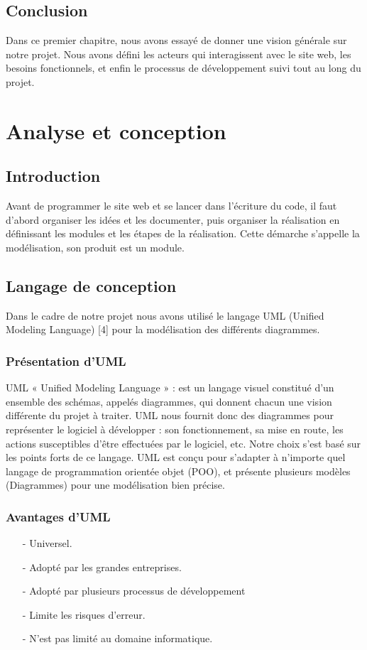 \documentclass[11.5pt]{report}
\begin{document}
\section{Conclusion}
Dans ce premier chapitre, nous avons essayé de donner une vision générale sur notre projet. Nous avons défini les acteurs qui interagissent avec le site web, les besoins fonctionnels, et enfin le processus de développement suivi tout au long du projet. 

\chapter{Analyse et conception}
\newpage
\section{Introduction}

Avant de programmer le site web et se lancer dans l’écriture du code, il faut d’abord organiser les idées et les documenter, puis organiser la réalisation en définissant les modules et les étapes de la réalisation. Cette démarche s’appelle la modélisation, son produit est un module.

\section{Langage de conception }
Dans le cadre de notre projet nous avons utilisé le langage UML (Unified Modeling Language) [4] pour la modélisation des différents diagrammes.
\subsection{Présentation d’UML }
UML « Unified Modeling Language » : est un langage visuel constitué d’un ensemble des schémas, appelés diagrammes, qui donnent chacun une vision différente du projet à traiter.
UML nous fournit donc des diagrammes pour représenter le logiciel à développer : son fonctionnement, sa mise en route, les actions susceptibles d’être effectuées par le logiciel, etc.
Notre choix s'est basé sur les points forts de ce langage. UML est conçu pour s'adapter à n'importe quel langage de programmation orientée objet (POO), et présente plusieurs modèles (Diagrammes) pour une modélisation bien précise.\\

\subsection{Avantages d’UML }
\begin{itemize}
	\item [-] Universel.
	\item [-] Adopté par les grandes entreprises. 
	\item [-] Adopté par plusieurs processus de développement 
	\item [-] Limite les risques d’erreur. 
	\item [-] N’est pas limité au domaine informatique.
	
\end{itemize}
\end{document}
